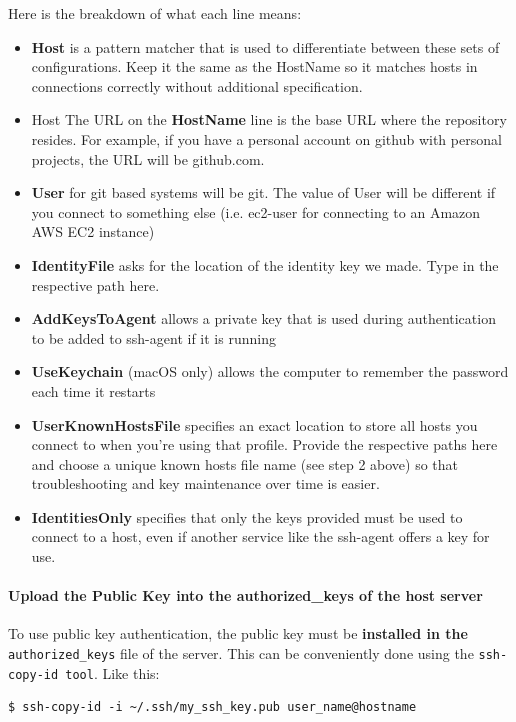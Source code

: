 \documentclass{article}
\newenvironment{codetemplate}[1][]{%
  \mybasecolorbox[#1]
  \itshape
}{%
  \endmybasecolorbox
}
\begin{document}
Here is the breakdown of what each line means:

\begin{itemize}
    \item \textbf{Host} is a pattern matcher that is used to differentiate between these sets of configurations. Keep it the same as the HostName so it matches hosts in connections correctly without additional specification.
    \item Host The URL on the \textbf{HostName} line is the base URL where the repository resides. For example, if you have a personal account on github with personal projects, the URL will be github.com.
    \item \textbf{User} for git based systems will be git. The value of User will be different if you connect to something else (i.e. ec2-user for connecting to an Amazon AWS EC2 instance)
    \item \textbf{IdentityFile} asks for the location of the identity key we made. Type in the respective path here.
    \item \textbf{AddKeysToAgent} allows a private key that is used during authentication to be added to ssh-agent if it is running
    \item \textbf{UseKeychain} (macOS only) allows the computer to remember the password each time it restarts
    \item \textbf{UserKnownHostsFile} specifies an exact location to store all hosts you connect to when you're using that profile. Provide the respective paths here and choose a unique known hosts file name (see step 2 above) so that troubleshooting and key maintenance over time is easier.
    \item \textbf{IdentitiesOnly} specifies that only the keys provided must be used to connect to a host, even if another service like the ssh-agent offers a key for use.
\end{itemize}




\paragraph{Upload the Public Key into the authorized\_keys of the host server}
To use public key authentication, the public key must be \textbf{installed in the} \verb|authorized_keys| file of the server. This can be conveniently done using the \verb|ssh-copy-id tool|. Like this:

\begin{codetemplate}{}
\begin{verbatim}
$ ssh-copy-id -i ~/.ssh/my_ssh_key.pub user_name@hostname
\end{verbatim}
\end{codetemplate}
\end{document}

